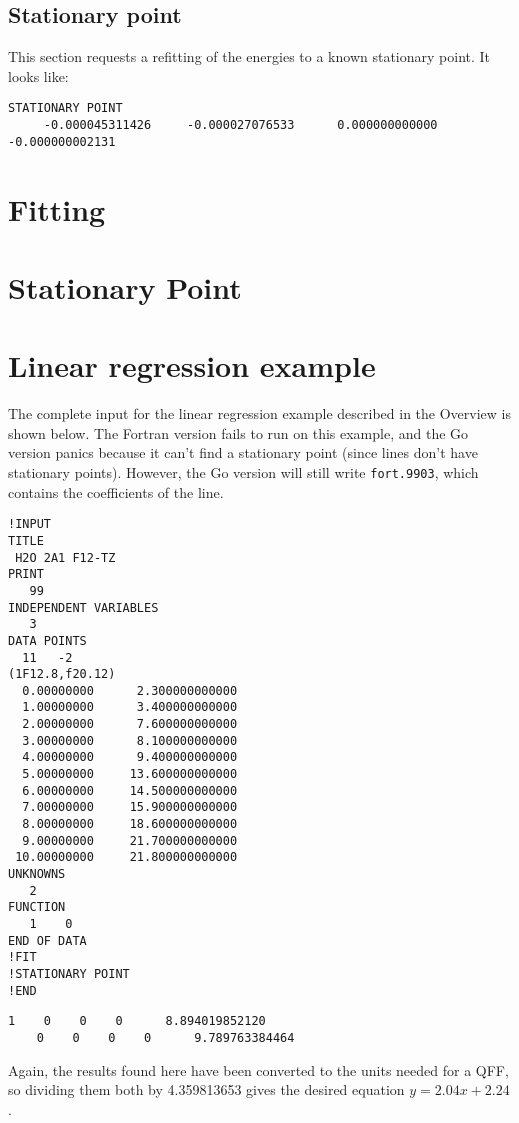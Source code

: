 \documentclass{article}
\begin{document}
\subsection{Stationary point}

This section requests a refitting of the energies to a known stationary point.
It looks like:

\begin{lstlisting}
STATIONARY POINT
     -0.000045311426     -0.000027076533      0.000000000000     -0.000000002131
\end{lstlisting}


\section{Fitting}

\section{Stationary Point}

\appendix

\section{Linear regression example}

The complete input for the linear regression example described in the Overview
is shown below. The Fortran version fails to run on this example, and the Go
version panics because it can't find a stationary point (since lines don't have
stationary points). However, the Go version will still write \verb|fort.9903|,
which contains the coefficients of the line.

\begin{lstlisting}[caption={anpass.in}]
!INPUT
TITLE
 H2O 2A1 F12-TZ
PRINT
   99
INDEPENDENT VARIABLES
   3
DATA POINTS
  11   -2
(1F12.8,f20.12)
  0.00000000      2.300000000000
  1.00000000      3.400000000000
  2.00000000      7.600000000000
  3.00000000      8.100000000000
  4.00000000      9.400000000000
  5.00000000     13.600000000000
  6.00000000     14.500000000000
  7.00000000     15.900000000000
  8.00000000     18.600000000000
  9.00000000     21.700000000000
 10.00000000     21.800000000000
UNKNOWNS
   2
FUNCTION
   1    0
END OF DATA
!FIT
!STATIONARY POINT
!END
\end{lstlisting}

\begin{lstlisting}[caption={fort.9903}]
    1    0    0    0      8.894019852120
    0    0    0    0      9.789763384464
\end{lstlisting}

\noindent
Again, the results found here have been converted to the units needed for a QFF,
so dividing them both by 4.359813653 gives the desired equation
$y = 2.04x + 2.24$.
\end{document}
